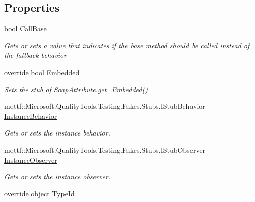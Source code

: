 \subsection*{Properties}
\begin{DoxyCompactItemize}
\item 
bool \hyperlink{class_system_1_1_runtime_1_1_remoting_1_1_metadata_1_1_fakes_1_1_stub_soap_attribute_a6670a58a9fcbe92ee37f577c959c0693}{Call\-Base}
\begin{DoxyCompactList}\small\item\em Gets or sets a value that indicates if the base method should be called instead of the fallback behavior\end{DoxyCompactList}\item 
override bool \hyperlink{class_system_1_1_runtime_1_1_remoting_1_1_metadata_1_1_fakes_1_1_stub_soap_attribute_ac1ad6efb0bf0afc5165a3341b8d89709}{Embedded}
\begin{DoxyCompactList}\small\item\em Sets the stub of Soap\-Attribute.\-get\-\_\-\-Embedded()\end{DoxyCompactList}\item 
mqttf\-::\-Microsoft.\-Quality\-Tools.\-Testing.\-Fakes.\-Stubs.\-I\-Stub\-Behavior \hyperlink{class_system_1_1_runtime_1_1_remoting_1_1_metadata_1_1_fakes_1_1_stub_soap_attribute_a04514075c86d1f010576654a89645312}{Instance\-Behavior}
\begin{DoxyCompactList}\small\item\em Gets or sets the instance behavior.\end{DoxyCompactList}\item 
mqttf\-::\-Microsoft.\-Quality\-Tools.\-Testing.\-Fakes.\-Stubs.\-I\-Stub\-Observer \hyperlink{class_system_1_1_runtime_1_1_remoting_1_1_metadata_1_1_fakes_1_1_stub_soap_attribute_ac17c170fcb6921465590571fa3c718ab}{Instance\-Observer}
\begin{DoxyCompactList}\small\item\em Gets or sets the instance observer.\end{DoxyCompactList}\item 
override object \hyperlink{class_system_1_1_runtime_1_1_remoting_1_1_metadata_1_1_fakes_1_1_stub_soap_attribute_a9791faef8823512e0a882dc806c3b845}{Type\-Id}

\end{DoxyCompactItemize}
